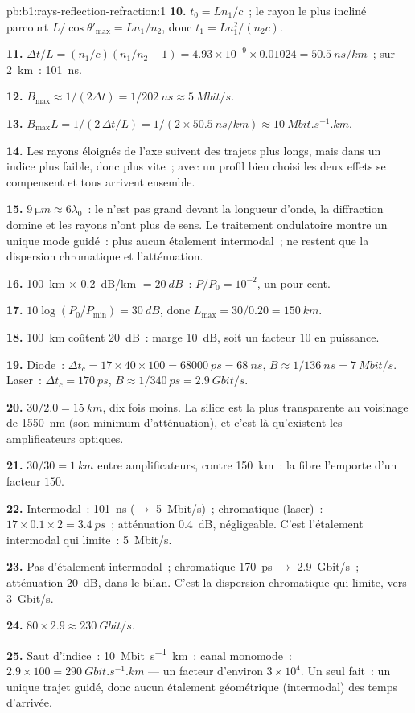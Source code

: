 \begin{solution}{pb:b1:rays-reflection-refraction:1}
\textbf{10.} $t_0 = Ln_1/c$~; le rayon le plus incliné parcourt $L/\cos\theta'_{\max} =
Ln_1/n_2$, donc $t_1 = Ln_1^2/(n_2 c)$.

\textbf{11.} $\Delta t/L = (n_1/c)(n_1/n_2 - 1) = 4.93\times10^{-9} \times
0.01024 = \qty{50.5}{ns/km}$~; sur \qty{2}{km}~: \qty{101}{ns}.

\textbf{12.} $B_{\max} \approx 1/(2\Delta t) = 1/\qty{202}{ns} \approx
\qty{5}{Mbit/s}$.

\textbf{13.} $B_{\max} L = 1/(2\,\Delta t/L) = 1/(2 \times
\qty{50.5}{ns/km}) \approx \qty{10}{Mbit.s^{-1}.km}$.

\textbf{14.} Les rayons éloignés de l'axe suivent des trajets plus
longs, mais dans un indice plus faible, donc plus vite~; avec un profil
bien choisi les deux effets se compensent et tous arrivent ensemble.

\textbf{15.} $\qty{9}{\micro m} \approx 6\lambda_0$~: le  n'est pas
grand devant la longueur d'onde, la diffraction domine et les rayons
n'ont plus de sens. Le traitement ondulatoire montre un unique mode
guidé~: plus aucun étalement intermodal~; ne restent que la dispersion
chromatique et l'atténuation.

\textbf{16.} \qty{100}{km} $\times$ \qty{0.2}{dB/km} $= \qty{20}{dB}$~:
$P/P_0 = 10^{-2}$, un pour cent.

\textbf{17.} $10\log(P_0/P_{\min}) = \qty{30}{dB}$, donc $L_{\max} =
30/0.20 = \qty{150}{km}$.

\textbf{18.} \qty{100}{km} coûtent \qty{20}{dB}~: marge \qty{10}{dB},
soit un facteur $10$ en puissance.

\textbf{19.} Diode~: $\Delta t_c = 17 \times 40 \times 100 = \qty{68000}{ps}
= \qty{68}{ns}$, $B \approx 1/\qty{136}{ns} = \qty{7}{Mbit/s}$. Laser~:
$\Delta t_c = \qty{170}{ps}$, $B \approx 1/\qty{340}{ps} =
\qty{2.9}{Gbit/s}$.

\textbf{20.} $30/2.0 = \qty{15}{km}$, dix fois moins. La silice est la
plus transparente au voisinage de \qty{1550}{nm} (son minimum
d'atténuation), et c'est là qu'existent les amplificateurs optiques.

\textbf{21.} $30/30 = \qty{1}{km}$ entre amplificateurs, contre
\qty{150}{km}~: la fibre l'emporte d'un facteur $150$.

\textbf{22.} Intermodal~: \qty{101}{ns} ($\to$ \qty{5}{Mbit/s})~;
chromatique (laser)~: $17 \times 0.1 \times 2 = \qty{3.4}{ps}$~;
atténuation \qty{0.4}{dB}, négligeable. C'est l'étalement intermodal qui
limite~: \qty{5}{Mbit/s}.

\textbf{23.} Pas d'étalement intermodal~; chromatique \qty{170}{ps} $\to$
\qty{2.9}{Gbit/s}~; atténuation \qty{20}{dB}, dans le bilan. C'est la
dispersion chromatique qui limite, vers \qty{3}{Gbit/s}.

\textbf{24.} $80 \times 2.9 \approx \qty{230}{Gbit/s}$.

\textbf{25.} Saut d'indice~: \qty{10}{Mbit.s^{-1}.km}~; canal monomode~:
$2.9 \times 100 = \qty{290}{Gbit.s^{-1}.km}$ --- un facteur d'environ
$3\times10^4$. Un seul fait~: un unique trajet guidé, donc aucun
étalement géométrique (intermodal) des temps d'arrivée.
\end{solution}
